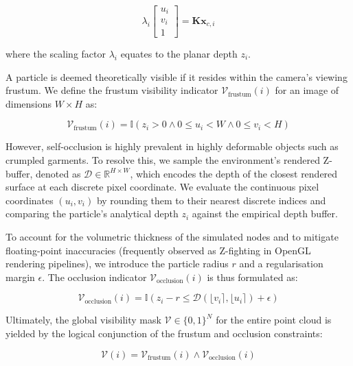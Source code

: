 \documentclass[journal]{IEEEtran}
\begin{document}
\begin{equation}
    \lambda_i \begin{bmatrix} u_i \\ v_i \\ 1 \end{bmatrix} = \mathbf{K} \mathbf{x}_{c,i}
\end{equation}

where the scaling factor $\lambda_i$ equates to the planar depth $z_i$. 

A particle is deemed theoretically visible if it resides within the camera's viewing frustum. We define the frustum visibility indicator $\mathcal{V}_{\text{frustum}}(i)$ for an image of dimensions $W \times H$ as:

\begin{equation}
    \mathcal{V}_{\text{frustum}}(i) = \mathbb{I}(z_i > 0 \land 0 \le u_i < W \land 0 \le v_i < H)
\end{equation}

However, self-occlusion is highly prevalent in highly deformable objects such as crumpled garments. To resolve this, we sample the environment's rendered Z-buffer, denoted as $\mathcal{D} \in \mathbb{R}^{H \times W}$, which encodes the depth of the closest rendered surface at each discrete pixel coordinate. We evaluate the continuous pixel coordinates $(u_i, v_i)$ by rounding them to their nearest discrete indices and comparing the particle's analytical depth $z_i$ against the empirical depth buffer.

To account for the volumetric thickness of the simulated nodes and to mitigate floating-point inaccuracies (frequently observed as Z-fighting in OpenGL rendering pipelines), we introduce the particle radius $r$ and a regularisation margin $\epsilon$. The occlusion indicator $\mathcal{V}_{\text{occlusion}}(i)$ is thus formulated as:

\begin{equation}
    \mathcal{V}_{\text{occlusion}}(i) = \mathbb{I}(z_i - r \le \mathcal{D}(\lfloor v_i \rceil, \lfloor u_i \rceil) + \epsilon)
\end{equation}

Ultimately, the global visibility mask $\mathcal{V} \in \{0, 1\}^N$ for the entire point cloud is yielded by the logical conjunction of the frustum and occlusion constraints:

\begin{equation}
    \mathcal{V}(i) = \mathcal{V}_{\text{frustum}}(i) \land \mathcal{V}_{\text{occlusion}}(i)
\end{equation}
\end{document}
